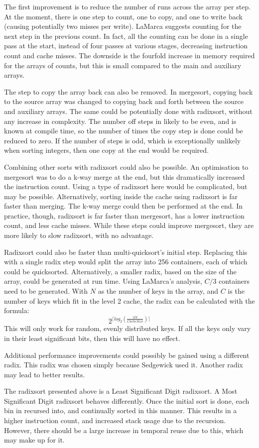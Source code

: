 The first improvement is to reduce the number of runs across the array per step.
At the moment, there is one step to count, one to copy, and one to write back
(causing potentially two misses per write). LaMarca suggests counting for the next
step in the previous count. In fact, all the counting can be done in a single
pass at the start, instead of four passes at various stages, decreasing instruction
count and cache misses. The downside is the fourfold increase in memory required
for the arrays of counts, but this is small compared to the main and auxiliary
arrays.

The step to copy the array back can also be removed. In mergesort, copying back
to the source array was changed to copying back and forth between the source and 
auxiliary arrays. The same could be potentially done with radixsort, without any
increase in complexity. The number off steps in likely to be even, and is known
at compile time, so the number of times the copy step is done could be reduced
to zero. If the number of steps is odd, which is exceptionally unlikely when
sorting integers, then one copy at the end would be required.

Combining other sorts with radixsort could also be possible. An optimisation to
mergesort was to do a k-way merge at the end, but this dramatically increased
the instruction count. Using a type of radixsort here would be complicated, but
may be possible. Alternatively, sorting inside the cache using radixsort is far
faster than merging. The k-way merge could then be performed at the end. In
practice, though, radixsort is far faster than mergesort, has a lower
instruction count, and less cache misses. While these steps could improve
mergesort, they are more likely to slow radixsort, with no advantage.

Radixsort could also be faster than multi-quicksort's initial step. Replacing
this with a single radix step would split the array into 256 containers, each of
which could be quicksorted. Alternatively, a smaller radix, based on the size of
the array, could be generated at run time. Using LaMarca's analysis,
$C/3$ containers need to be generated. With $N$ as the number of keys in the
array, and $C$ is the number of keys which fit in the level 2 cache, the radix
can be calculated with the formula:
$$2^{\lceil{}log_2(\frac{3N}{CacheSize})\rceil{}}$$
This will only work for random, evenly distributed keys. If all the keys only
vary in their least significant bits, then this will have no effect.

Additional performance improvements could possibly be gained using a different
radix. This radix was chosen simply because Sedgewick used it. Another radix may
lead to better results.

The radixsort presented above is a Least Significant Digit radixsort. A Most
Significant Digit radixsort behaves differently. Once the initial sort is done, each
bin in recursed into, and continually sorted in this manner. This results in a
higher instruction count, and increased stack usage due to the recursion.
However, there should be a large increase in temporal reuse due to this, which
may make up for it.

